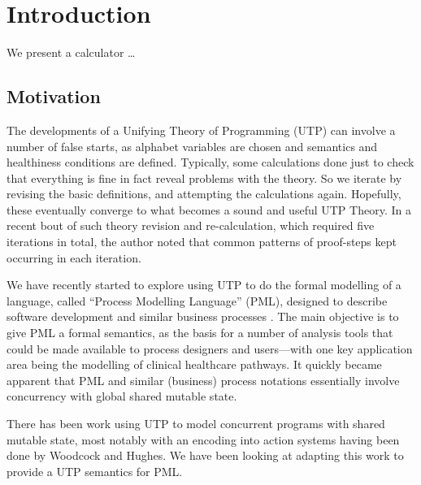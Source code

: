 \section{Introduction}\label{sec:Intro}

We present a calculator \dots

\subsection{Motivation}

The developments of a Unifying Theory of Programming (UTP)
can involve a number of false starts,
as alphabet variables are chosen
and semantics and healthiness conditions are defined.
Typically, some calculations done just to check that everything
is fine in fact reveal problems with the theory.
So we iterate by revising the basic definitions,
and attempting the calculations again.
Hopefully, these eventually converge to what becomes a sound and useful
UTP Theory.
In a recent bout of such theory revision and re-calculation,
which required five iterations in total,
the author noted that common patterns of proof-steps kept occurring
in each iteration.

We have recently started to explore using UTP
to do the  formal modelling of a language,
called ``Process Modelling Language'' (PML),
designed to describe software development and similar business
processes \cite{DBLP:journals/infsof/AtkinsonWN07}.
The main objective is to give PML a formal semantics,
as the basis for a number of analysis tools that could be made available
to process designers and users---with one key application
area being the modelling of clinical healthcare pathways.
It quickly became apparent that PML and similar (business) process
notations essentially involve concurrency with global shared mutable state.

There has been work using UTP
to model concurrent programs with shared mutable state,
most notably
with an encoding into action systems having been done by
Woodcock and Hughes\cite{DBLP:conf/icfem/WoodcockH02}.
We have been looking at adapting this work to provide a UTP semantics
for PML.

